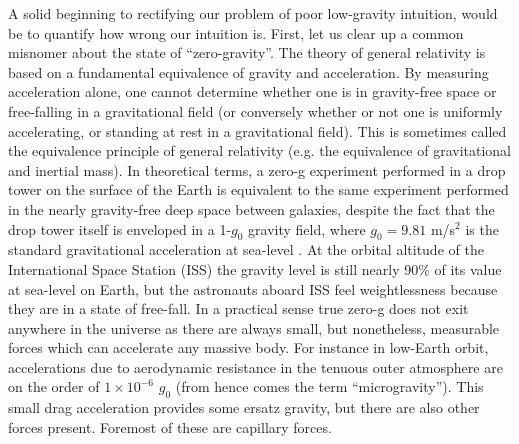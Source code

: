 \documentclass[12pt,a4paper,oneside]{book}
\begin{document}
A solid beginning to rectifying our problem of poor low-gravity intuition, would be to quantify how wrong our intuition is. First, let us clear up a common misnomer about the state of ``zero-gravity''. The theory of general relativity is based on a fundamental equivalence of gravity and acceleration. By measuring acceleration alone, one cannot determine whether one is in gravity-free space or free-falling in a gravitational field (or conversely whether or not one is uniformly accelerating, or standing at rest in a gravitational field). This is sometimes called the equivalence principle of general relativity (e.g. the equivalence of gravitational and inertial mass). In theoretical terms, a zero-g experiment performed in a drop tower on the surface of the Earth is equivalent to the same experiment performed in the nearly gravity-free deep space between galaxies, despite the fact that the drop tower itself is enveloped in a 1-$g_0$ gravity field, where $g_0=9.81$ m/s$^2$ is the standard gravitational acceleration at sea-level . At the orbital altitude of the International Space Station (ISS) the gravity level is still nearly 90\% of its value at sea-level on Earth, but the astronauts aboard ISS feel weightlessness because they are in a state of free-fall. In a practical sense true zero-g does not exit anywhere in the universe as there are always small, but nonetheless, measurable forces which can accelerate any massive body. For instance in low-Earth orbit, accelerations due to aerodynamic resistance in the tenuous outer atmosphere are on the order of $1 \times 10^{-6}$ $g_0$ (from hence comes the term ``microgravity''). This small drag acceleration provides some ersatz gravity, but there are also other forces present. Foremost of these are capillary forces. 
\end{document}
